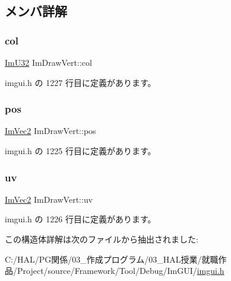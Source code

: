 \subsection{メンバ詳解}
\mbox{\label{struct_im_draw_vert_ab98ba53ce2690b56f5ba94682ed83940}} 
\subsubsection{\texorpdfstring{col}{col}}
{\footnotesize\ttfamily \mbox{\hyperlink{imgui_8h_a118cff4eeb8d00e7d07ce3d6460eed36}{Im\+U32}} Im\+Draw\+Vert\+::col}



 imgui.\+h の 1227 行目に定義があります。

\mbox{\label{struct_im_draw_vert_aedc578bbf364ddea71be12b4f177a5b4}} 
\subsubsection{\texorpdfstring{pos}{pos}}
{\footnotesize\ttfamily \mbox{\hyperlink{struct_im_vec2}{Im\+Vec2}} Im\+Draw\+Vert\+::pos}



 imgui.\+h の 1225 行目に定義があります。

\mbox{\label{struct_im_draw_vert_abdf3183529055a6c3f709b23a4bf06b1}} 
\subsubsection{\texorpdfstring{uv}{uv}}
{\footnotesize\ttfamily \mbox{\hyperlink{struct_im_vec2}{Im\+Vec2}} Im\+Draw\+Vert\+::uv}



 imgui.\+h の 1226 行目に定義があります。



この構造体詳解は次のファイルから抽出されました\+:\begin{DoxyCompactItemize}
\item 
C\+:/\+H\+A\+L/\+P\+G関係/03\+\_\+作成プログラム/03\+\_\+\+H\+A\+L授業/就職作品/\+Project/source/\+Framework/\+Tool/\+Debug/\+Im\+G\+U\+I/\mbox{\hyperlink{imgui_8h}{imgui.\+h}}\end{DoxyCompactItemize}
